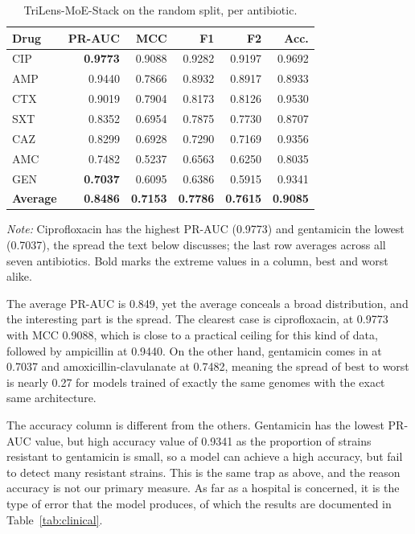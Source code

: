 \documentclass[journal]{IEEEtran}
\begin{document}
\begin{table}[!tb]
\caption{TriLens-MoE-Stack on the random split, per antibiotic.}
\label{tab:main}
\centering
\small
\setlength{\tabcolsep}{4pt}
\renewcommand{\arraystretch}{1.05}
\begin{tabular}{|l|r|r|r|r|r|}
\hline
\rowcolor{headgrey}
\textbf{Drug} & \textbf{PR-AUC} & \textbf{MCC} & \textbf{F1} & \textbf{F2} & \textbf{Acc.} \\ \hline
CIP & \textbf{0.9773} & 0.9088 & 0.9282 & 0.9197 & 0.9692 \\ \hline
AMP & 0.9440 & 0.7866 & 0.8932 & 0.8917 & 0.8933 \\ \hline
CTX & 0.9019 & 0.7904 & 0.8173 & 0.8126 & 0.9530 \\ \hline
SXT & 0.8352 & 0.6954 & 0.7875 & 0.7730 & 0.8707 \\ \hline
CAZ & 0.8299 & 0.6928 & 0.7290 & 0.7169 & 0.9356 \\ \hline
AMC & 0.7482 & 0.5237 & 0.6563 & 0.6250 & 0.8035 \\ \hline
GEN & \textbf{0.7037} & 0.6095 & 0.6386 & 0.5915 & 0.9341 \\ \hline
\rowcolor{oursblue}
\textbf{Average} & \textbf{0.8486} & \textbf{0.7153} & \textbf{0.7786} & \textbf{0.7615} & \textbf{0.9085} \\ \hline
\end{tabular}
\renewcommand{\arraystretch}{1.0}
\vspace{0.4em}

\noindent\footnotesize\textit{Note:} Ciprofloxacin has the highest PR-AUC (0.9773) and
gentamicin the lowest (0.7037), the spread the text below discusses; the last row averages
across all seven antibiotics. Bold marks the extreme values in a column, best and worst alike.
\end{table}

The average PR-AUC is 0.849, yet the average conceals a broad distribution, and the
interesting part is the spread. The clearest case is ciprofloxacin, at 0.9773 with
MCC 0.9088, which is close to a practical ceiling for this kind of data, followed by
ampicillin at 0.9440. On the other hand, gentamicin comes in at 0.7037 and
amoxicillin-clavulanate at 0.7482, meaning the spread of best to worst is nearly 0.27
for models trained of exactly the same genomes with the exact same architecture.

The accuracy column is different from the others. Gentamicin has the lowest PR-AUC
value, but high accuracy value of 0.9341 as the proportion of strains resistant to
gentamicin is small, so a model can achieve a high accuracy, but fail to detect many
resistant strains. This is the same trap as above, and the reason accuracy is not our
primary measure. As far as a hospital is concerned, it is the type of error that the
model produces, of which the results are documented in Table~\ref{tab:clinical}.
\end{document}
